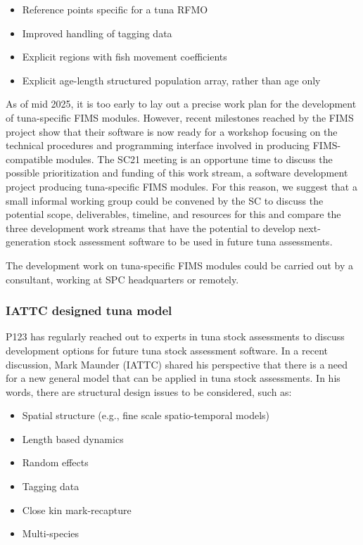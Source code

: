 \documentclass{SCreport}
\begin{document}
\begin{itemize}
  \item Reference points specific for a tuna RFMO\\[-4.5ex]
  \item Improved handling of tagging data\\[-4.5ex]
  \item Explicit regions with fish movement coefficients\\[-4.5ex]
  \item Explicit age-length structured population array, rather than age only
\end{itemize}

As of mid 2025, it is too early to lay out a precise work plan for the
development of tuna-specific FIMS modules. However, recent milestones reached by
the FIMS project show that their software is now ready for a workshop focusing
on the technical procedures and programming interface involved in producing
FIMS-compatible modules. The SC21 meeting is an opportune time to discuss the
possible prioritization and funding of this work stream, a software development
project producing tuna-specific FIMS modules. For this reason, we suggest that a
small informal working group could be convened by the SC to discuss the
potential scope, deliverables, timeline, and resources for this and compare the
three development work streams that have the potential to develop
next-generation stock assessment software to be used in future tuna assessments.

The development work on tuna-specific FIMS modules could be carried out by a
consultant, working at SPC headquarters or remotely.

\vspace{2ex}

\subsubsection{IATTC designed tuna model}
\label{sec:iattc-tuna-model}

P123 has regularly reached out to experts in tuna stock assessments to discuss
development options for future tuna stock assessment software. In a recent
discussion, Mark Maunder (IATTC) shared his perspective that there is a need for
a new general model that can be applied in tuna stock assessments. In his words,
there are structural design issues to be considered, such as:

\begin{itemize}
  \item Spatial structure (e.g., fine scale spatio-temporal models)\\[-4.5ex]
  \item Length based dynamics\\[-4.5ex]
  \item Random effects\\[-4.5ex]
  \item Tagging data\\[-4.5ex]
  \item Close kin mark-recapture\\[-4.5ex]
  \item Multi-species
\end{itemize}
\end{document}
